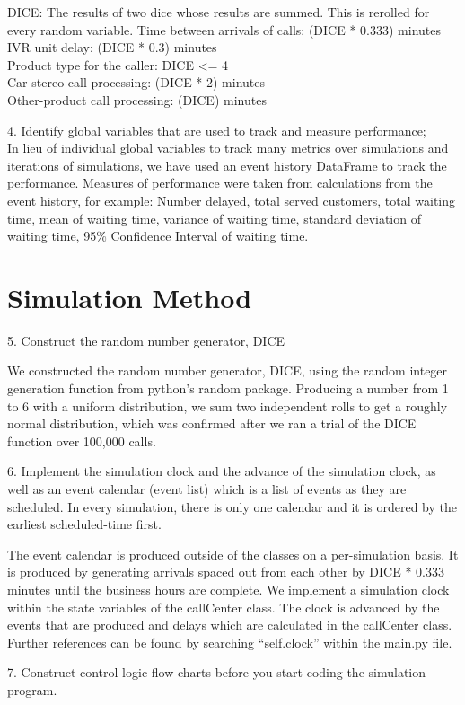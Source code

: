 \documentclass{article}
\begin{document}
DICE: The results of two dice whose results are summed. This is rerolled for every random variable.
Time between arrivals of calls: (DICE * 0.333) minutes \\
IVR unit delay: (DICE * 0.3) minutes \\
Product type for the caller: DICE <= 4 \\
Car-stereo call processing: (DICE * 2) minutes \\
Other-product call processing: (DICE) minutes \\
\par
4. Identify global variables that are used to track and measure performance; \\
In lieu of individual global variables to track many metrics over simulations and iterations of simulations, we have used an event history DataFrame to track the performance. Measures of performance were taken from calculations from the event history, for example: Number delayed, total served customers, total waiting time, mean of waiting time, variance of waiting time, standard deviation of waiting time, 95\% Confidence Interval of waiting time.



\section{Simulation Method}

5. Construct the random number generator, DICE \\
\par

We constructed the random number generator, DICE, using the random integer generation function from python’s random package. Producing a number from 1 to 6 with a uniform distribution, we sum two independent rolls to get a roughly normal distribution, which was confirmed after we ran a trial of the DICE function over 100,000 calls. \\
\par

6. Implement the simulation clock and the advance of the simulation clock, as well as an event calendar (event list) which is a list of events as they are scheduled. In every simulation, there is only one calendar and it is ordered by the earliest scheduled-time first. \\
\par

The event calendar is produced outside of the classes on a per-simulation basis. It is produced by generating arrivals spaced out from each other by DICE * 0.333 minutes until the business hours are complete. We implement a simulation clock within the state variables of the callCenter class. The clock is advanced by the events that are produced and delays which are calculated in the callCenter class. Further references can be found by searching “self.clock” within the main.py file. \\
\par
7. Construct control logic flow charts before you start coding the simulation program. \\
\end{document}
